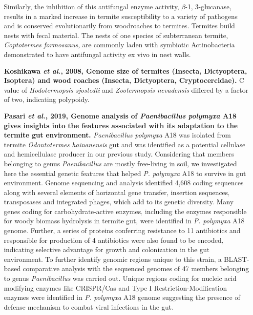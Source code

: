 \documentclass[11pt]{article}
\begin{document}
\begin{sloppypar}
Similarly, the inhibition of this antifungal enzyme activity, $\beta$-1, 3-glucanase, results in a marked increase in termite susceptibility to a variety of pathogens and is conserved evolutionarily from woodroaches to termites. 
Termites build nests with fecal material. 
The nests of one species of subterranean termite, \textit{Coptotermes formosanus}, are commonly laden with symbiotic Actinobacteria demonstrated to have antifungal activity ex vivo in nest walls.
\par
\textbf{Koshikawa \textit{et al.}, 2008, Genome size of termites (Insecta, Dictyoptera, Isoptera) and wood roaches (Insecta, Dictyoptera, Cryptocercidae).} \newline
C value of \textit{Hodotermopsis sjostedti} and \textit{Zootermopsis nevadensis} differed by a factor of two, indicating polypoidy.
\par
\textbf{Pasari \textit{et al.}, 2019, Genome analysis of \textit{Paenibacillus polymyxa} A18 gives insights into the features associated with its adaptation to the termite gut environment.} \newline
\textit{Paenibacillus polymyxa} A18 was isolated from termite \textit{Odontotermes hainanensis} gut and was identified as a potential cellulase and hemicellulase producer in our previous study. 
Considering that members belonging to genus \textit{Paenibacillus} are mostly free-living in soil, we investigated here the essential genetic features that helped \textit{P. polymyxa} A18 to survive in gut environment. 
Genome sequencing and analysis identified 4,608 coding sequences along with several elements of horizontal gene transfer, insertion sequences, transposases and integrated phages, which add to its genetic diversity. 
Many genes coding for carbohydrate-active enzymes, including the enzymes responsible for woody biomass hydrolysis in termite gut, were identified in \textit{P. polymyxa} A18 genome. 
Further, a series of proteins conferring resistance to 11 antibiotics and responsible for production of 4 antibiotics were also found to be encoded, indicating selective advantage for growth and colonization in the gut environment. 
To further identify genomic regions unique to this strain, a BLAST-based comparative analysis with the sequenced genomes of 47 members belonging to genus \textit{Paenibacillus} was carried out. 
Unique regions coding for nucleic acid modifying enzymes like CRISPR/Cas and Type I Restriction-Modification enzymes were identified in \textit{P. polymyxa} A18 genome suggesting the presence of defense mechanism to combat viral infections in the gut. 

\end{sloppypar}
\end{document}

